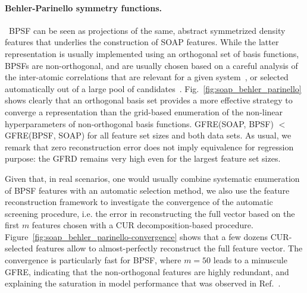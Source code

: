\paragraph*{Behler-Parinello symmetry functions.}\,
BPSF can be seen as projections of the same, abstract symmetrized density features that underlies the construction of SOAP features.  While the latter representation is usually implemented using an orthogonal set of basis functions, BPSFs are non-orthogonal, and are usually chosen based on a careful analysis of the inter-atomic correlations that are relevant for a given system~\cite{behl11jcp,jose+12jcp,behl15ijqc}, or selected automatically out of a large pool of candidates~\cite{imba+18jcp}. 
Fig.~\ref{fig:soap_behler_parinello} shows clearly that an orthogonal basis set provides a more effective strategy to converge a representation than the grid-based enumeration of the non-linear hyperparameters of non-orthogonal basis functions. GFRE(SOAP, BPSF) $<$ GFRE(BPSF, SOAP) for all feature set sizes and both data sets. As usual, we remark that zero reconstruction error does not imply equivalence for regression purpose: the GFRD remains very high even for the largest feature set sizes. 

Given that, in real scenarios, one would usually combine systematic enumeration of BPSF features with an automatic selection method\cite{imba+18jcp}, we also use the feature reconstruction framework to investigate the convergence of the automatic screening procedure, i.e. the error in reconstructing the full vector based on the first $m$ features chosen with a CUR decomposition-based procedure\cite{mahoney2009cur, imba+18jcp}.
Figure~\ref{fig:soap_behler_parinello-convergence} shows that a few dozens CUR-selected features allow to almost-perfectly reconstruct the full feature vector. The convergence is particularly fast for BPSF, where $m=50$ leads to a minuscule GFRE, indicating that the non-orthogonal features are highly redundant, and explaining the saturation in model performance that was observed in Ref.~.

